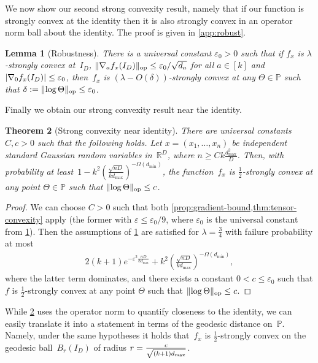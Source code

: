 \documentclass[aos]{imsart}
\newtheorem{theorem}{Theorem}[section]
\newtheorem{lemma}[theorem]{Lemma}
\theoremstyle{definition}
\numberwithin{equation}{section}
\DeclareMathOperator{\op}{op}
\DeclarePairedDelimiter{\abs}{\lvert}{\rvert}
\DeclarePairedDelimiter{\norm}{\lVert}{\rVert}
\newcommand{\R}{{\mathbb{R}}}
\renewcommand{\P}{{\mathbb{P}}}
\newcommand{\eps}{\varepsilon}
\newcommand{\samp}{x}
\begin{document}
We now show our second strong convexity result, namely that if our function is strongly convex at the identity then it is also strongly convex in an operator norm ball about the identity.
The proof is given in \cref{app:robust}.

\begin{lemma}[Robustness]\label{convexRobustness}
There is a universal constant $\eps_0>0$ such that if $f_x$ is $\lambda$-strongly convex at~$I_D$, $\norm{\nabla_a f_x(I_D)}_{\op} \leq \eps_0/\sqrt{d_a}$ for all $a\in[k]$ and $\abs{\nabla_{0} f_{\samp}(I_{D})} \leq \eps_0$, then~$f_x$ is $(\lambda-O(\delta))$-strongly convex at any $\Theta\in\P$ such that $\delta := \norm{\log\Theta}_{\op} \leq \eps_0$.
\end{lemma}

Finally we obtain our strong convexity result near the identity.

\begin{theorem}[Strong convexity near identity]\label{thm:ball-convexity}
There are universal constants $C,c>0$ such that the following holds.
Let $x = (x_1,\dots,x_n)$ be independent standard Gaussian random variables in~$\R^D$, where $n \geq C k \frac{d_{\max}^2}D$.
Then, with probability at least~$1 - k^2 ( \frac{\sqrt{nD}}{k d_{\max}} )^{-\Omega(d_{\min})}$,
the function~$f_x$ is $\frac12$-strongly convex at any point $\Theta\in\P$ such that $\norm{\log\Theta}_{\op} \leq c$.
\end{theorem}
\begin{proof}
We can choose $C>0$ such that both \cref{prop:gradient-bound,thm:tensor-convexity} apply (the former with $\eps\leq\eps_0/9$, where $\eps_0$ is the universal constant from \cref{convexRobustness}).
Then the assumptions of \cref{convexRobustness} are satisfied for $\lambda=\frac34$ with failure probability at most
\begin{align*}
  2(k+1)e^{-\eps^2 \frac{nD}{8d_{\max}}} + k^2 \left( \frac{\sqrt{nD}}{k d_{\max}} \right)^{-\Omega(d_{\min})},
\end{align*}
where the latter term dominates, and there exists a constant $0<c\leq\eps_0$ such that $f$ is $\frac12$-strongly convex at any point $\Theta$ such that $\norm{\log\Theta}_{\op} \leq c$.
\end{proof}

While \cref{thm:ball-convexity} uses the operator norm to quantify closeness to the identity, we can easily translate it into a statement in terms of the geodesic distance on~$\P$.
Namely, under the same hypotheses it holds that~$f_x$ is $\frac12$-strongly convex on the geodesic ball~$B_r(I_D)$ of radius $r=\smash{\frac c{\sqrt{(k+1)d_{\max}}}}$.
\end{document}
